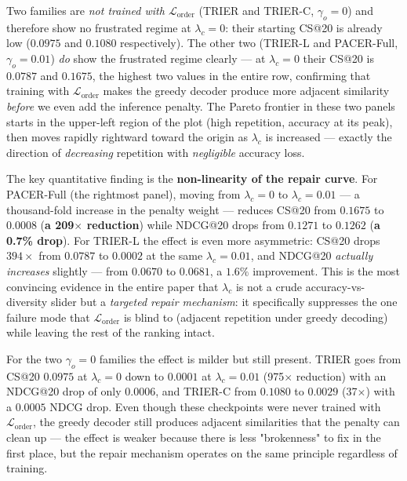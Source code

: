 Two families are \emph{not trained with $\mathcal{L}_{\text{order}}$}
(TRIER and TRIER-C, $\gamma_o=0$) and therefore show no frustrated regime
at $\lambda_c=0$: their starting CS@20 is already low ($0.0975$ and
$0.1080$ respectively). The other two (TRIER-L and PACER-Full,
$\gamma_o=0.01$) \emph{do} show the frustrated regime clearly — at
$\lambda_c=0$ their CS@20 is $0.0787$ and $0.1675$, the highest two values
in the entire row, confirming that training with
$\mathcal{L}_{\text{order}}$ makes the greedy decoder produce more
adjacent similarity \emph{before} we even add the inference penalty. The
Pareto frontier in these two panels starts in the upper-left region of the
plot (high repetition, accuracy at its peak), then moves rapidly rightward
toward the origin as $\lambda_c$ is increased — exactly the direction of
\emph{decreasing} repetition with \emph{negligible} accuracy loss.

The key quantitative finding is the \textbf{non-linearity of the repair
curve}. For PACER-Full (the rightmost panel), moving from $\lambda_c=0$
to $\lambda_c=0.01$ — a thousand-fold increase in the penalty weight —
reduces CS@20 from $0.1675$ to $0.0008$ (\textbf{a 209$\times$ reduction})
while NDCG@20 drops from $0.1271$ to $0.1262$ (\textbf{a 0.7\% drop}).
For TRIER-L the effect is even more asymmetric: CS@20 drops $394\times$
from $0.0787$ to $0.0002$ at the same $\lambda_c=0.01$, and NDCG@20
\emph{actually increases} slightly — from $0.0670$ to $0.0681$, a $1.6\%$
improvement. This is the most convincing evidence in the entire paper
that $\lambda_c$ is not a crude accuracy-vs-diversity slider but a
\emph{targeted repair mechanism}: it specifically suppresses the one
failure mode that $\mathcal{L}_{\text{order}}$ is blind to (adjacent
repetition under greedy decoding) while leaving the rest of the ranking
intact.

For the two $\gamma_o=0$ families the effect is milder but still present.
TRIER goes from CS@20 $0.0975$ at $\lambda_c=0$ down to $0.0001$ at
$\lambda_c=0.01$ (975$\times$ reduction) with an NDCG@20 drop of only
$0.0006$, and TRIER-C from $0.1080$ to $0.0029$ (37$\times$) with a
$0.0005$ NDCG drop. Even though these checkpoints were never trained with
$\mathcal{L}_{\text{order}}$, the greedy decoder still produces adjacent
similarities that the penalty can clean up — the effect is weaker
because there is less "brokenness" to fix in the first place, but the
repair mechanism operates on the same principle regardless of training.

